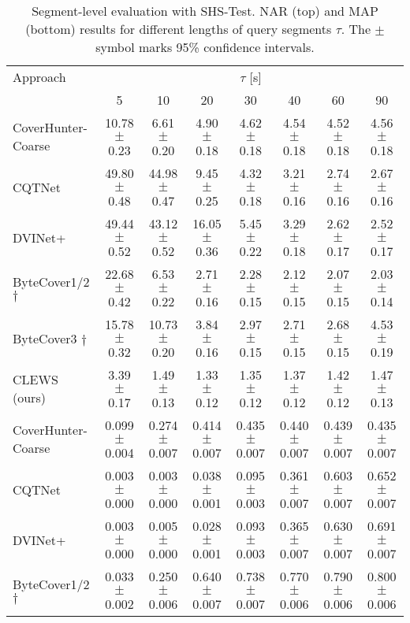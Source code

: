 \begin{table*}[h]
\caption{Segment-level evaluation with SHS-Test. NAR (top) and MAP (bottom) results for different lengths of query segments $\tau$. The $\pm$ symbol marks 95\% confidence intervals.}
\label{tab:seg_shs}
\vskip 0.15in
\begin{adjustbox}{max width=\textwidth}
\begin{sc}
\begin{tabular}{lccccccc}
\toprule
Approach & \multicolumn{7}{c}{$\tau$ [s]} \\
        \cline{2-8}
    & 5 & 10 & 20 & 30 & 40 & 60 & 90 \\
\midrule
CoverHunter-Coarse & 10.78 $\pm$ 0.23 & 6.61 $\pm$ 0.20 & 4.90 $\pm$ 0.18 & 4.62 $\pm$ 0.18 & 4.54 $\pm$ 0.18 & 4.52 $\pm$ 0.18 & 4.56 $\pm$ 0.18 \\
CQTNet & 49.80 $\pm$ 0.48 & 44.98 $\pm$ 0.47 & 9.45 $\pm$ 0.25 & 4.32 $\pm$ 0.18 & 3.21 $\pm$ 0.16 & 2.74 $\pm$ 0.16 & 2.67 $\pm$ 0.16 \\
DVINet+ & 49.44 $\pm$ 0.52 & 43.12 $\pm$ 0.52 & 16.05 $\pm$ 0.36 & 5.45 $\pm$ 0.22 & 3.29 $\pm$ 0.18 & 2.62 $\pm$ 0.17 & 2.52 $\pm$ 0.17 \\
ByteCover1/2 $\dag$ & 22.68 $\pm$ 0.42 & 6.53 $\pm$ 0.22 & 2.71 $\pm$ 0.16 & 2.28 $\pm$ 0.15 & 2.12 $\pm$ 0.15 & 2.07 $\pm$ 0.15 & 2.03 $\pm$ 0.14 \\
ByteCover3 $\dag$ & 15.78 $\pm$ 0.32 & 10.73 $\pm$ 0.20 & 3.84 $\pm$ 0.16 & 2.97 $\pm$ 0.15 & 2.71 $\pm$ 0.15 & 2.68 $\pm$ 0.15 & 4.53 $\pm$ 0.19 \\
CLEWS (ours) & 3.39 $\pm$ 0.17 & 1.49 $\pm$ 0.13 & 1.33 $\pm$ 0.12 & 1.35 $\pm$ 0.12 & 1.37 $\pm$ 0.12 & 1.42 $\pm$ 0.12 & 1.47 $\pm$ 0.13 \\
\midrule
CoverHunter-Coarse & 0.099 $\pm$ 0.004 & 0.274 $\pm$ 0.007 & 0.414 $\pm$ 0.007 & 0.435 $\pm$ 0.007 & 0.440 $\pm$ 0.007 & 0.439 $\pm$ 0.007 & 0.435 $\pm$ 0.007 \\
CQTNet & 0.003 $\pm$ 0.000 & 0.003 $\pm$ 0.000 & 0.038 $\pm$ 0.001 & 0.095 $\pm$ 0.003 & 0.361 $\pm$ 0.007 & 0.603 $\pm$ 0.007 & 0.652 $\pm$ 0.007 \\
DVINet+ & 0.003 $\pm$ 0.000 & 0.005 $\pm$ 0.000 & 0.028 $\pm$ 0.001 & 0.093 $\pm$ 0.003 & 0.365 $\pm$ 0.007 & 0.630 $\pm$ 0.007 & 0.691 $\pm$ 0.007 \\
ByteCover1/2 $\dag$ & 0.033 $\pm$ 0.002 & 0.250 $\pm$ 0.006 & 0.640 $\pm$ 0.007 & 0.738 $\pm$ 0.007 & 0.770 $\pm$ 0.006 & 0.790 $\pm$ 0.006 & 0.800 $\pm$ 0.006 \\

\end{tabular}
\end{sc}
\end{adjustbox}
\end{table*}

